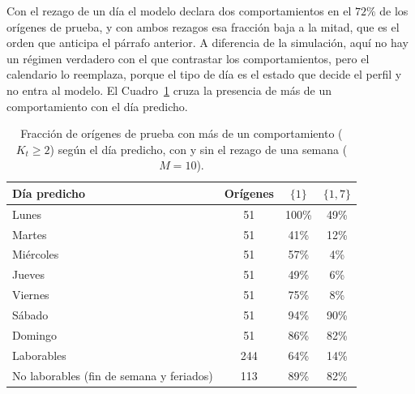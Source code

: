 Con el rezago de un día el modelo declara dos comportamientos en el $72\%$ de los orígenes de prueba, y con ambos rezagos esa fracción baja a la mitad, que es el orden que anticipa el párrafo anterior. A diferencia de la simulación, aquí no hay un régimen verdadero con el que contrastar los comportamientos, pero el calendario lo reemplaza, porque el tipo de día es el estado que decide el perfil y no entra al modelo. El Cuadro~\ref{tab:apl_K_calendario} cruza la presencia de más de un comportamiento con el día predicho.

\begin{table}[H]
\centering\small
\caption{Fracción de orígenes de prueba con más de un comportamiento ($K_t \ge 2$) según el día predicho, con y sin el rezago de una semana ($M = 10$).}
\label{tab:apl_K_calendario}
\begin{tabular}{l c cc}
\hline
Día predicho & Orígenes & $\{1\}$ & $\{1,7\}$ \\
\hline
Lunes     & 51  & 100\% & 49\% \\
Martes    & 51  & 41\%  & 12\% \\
Miércoles & 51  & 57\%  & 4\%  \\
Jueves    & 51  & 49\%  & 6\%  \\
Viernes   & 51  & 75\%  & 8\%  \\
Sábado    & 51  & 94\%  & 90\% \\
Domingo   & 51  & 86\%  & 82\% \\
\hline
Laborables    & 244 & 64\% & 14\% \\
No laborables (fin de semana y feriados) & 113 & 89\% & 82\% \\
\hline
\end{tabular}
\end{table}

